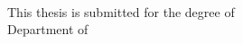 \begin{titlepage}
    \begin{addmargin}[-1cm]{-3cm}
    \begin{center}
        \large  

        \hfill

        \vfill

        \begingroup
            \color{Maroon}\spacedallcaps{\myTitle} \\ \bigskip
        \endgroup

        \spacedlowsmallcaps{\myName}

        \vfill


        This thesis is submitted for the degree of \myDegree \\
        Department of \myDepartment \\   
        \myCollege \\
        \myUni \\ \bigskip

        \myTime\ 

        \vfill                      

    \end{center}  
  \end{addmargin}       
\end{titlepage}   